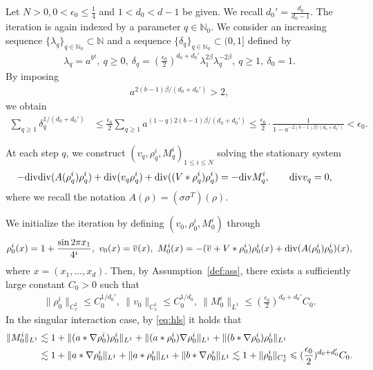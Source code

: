 \documentclass[UTF-8,reqno]{amsart}
\numberwithin{equation}{section}
\theoremstyle{definition}
\def\geq{\geqslant}
\def\leq{\leqslant}
\def\div{\mathord{{\rm div}}}
\def\geq{\geqslant}
\def\leq{\leqslant}
\def\div{\mathord{{\rm div}}}
\begin{document}
Let $N>0,0<\epsilon_0\leq \frac14$ and $1<d_0<d-1$ be given. We recall $d_0'=\frac{d_0}{d_0-1}$. The iteration is again indexed by a parameter
$
q\in\mathbb{N}_0.
$
We consider an increasing sequence
$
\{\lambda_q\}_{q\in\mathbb{N}_0}\subset\mathbb{N}
$
and a sequence
$
\{\delta_q\}_{q\in\mathbb{N}_0}\subset(0,1]
$
defined  by \begin{align*}
\lambda_q
=
a^{b^q},
\ 
q\geq0,
\ 
\delta_q
=
(\frac{\epsilon_0}{2})^{d_0+d_0'}
\lambda_1^{2\beta}
\lambda_q^{-2\beta},
\ 
q\geq1,
\ 
\delta_0=1.
\end{align*}  By imposing
\begin{align}
a^{2(b-1)\beta/(d_0+d_0')}>2,
\label{ieq:5ab2}
\end{align}
we obtain
\begin{align*}
\sum_{q\geq1}\delta_q^{1/(d_0+d_0')}
&\leq
\frac{\epsilon_0}{2} 
\sum_{q\geq1}
a^{(1-q)2(b-1)\beta/(d_0+d_0')}\leq
\frac{\epsilon_0}{2}
\cdot
\frac1{1-a^{-2(b-1)\beta/(d_0+d_0')}}
<
\epsilon_0.
\end{align*}

At each step $q$, we construct  
$
(v_q,\rho^i_q,M^i_q)_{1\leq i\leq N}
$
solving the stationary system
\begin{align}
-\div\div(A(\rho^i_q)\rho^i_q)
+
\div(v_q\rho^i_q)+\div((V*\rho_q^i)\rho_q^i)
&=
-\div M^i_q,
\qquad
\div v_q=0,
\label{eq:5qth}
\end{align}
where we recall the notation
$
A(\rho)=(\sigma\sigma^T)(\rho).
$
 

We initialize the iteration by defining
$
(v_0,\rho^i_0,M^i_0)
$
through
\begin{align*}
\rho^i_0(x)
=
1+\frac{\sin 2\pi x_1}{4^i},
\ 
v_0(x)=\overline v(x),
\ 
M^i_0(x)
=-(\overline v+V*\rho_0^i)\rho^i_0(x)+\div(
A(\rho^i_0)\rho^i_0)(x),
\end{align*}
where
$
x=(x_1,\dots,x_d).
$
Then, by Assumption~\ref{def:ass}, there exists a sufficiently large constant $C_0>0$ such that
\begin{align}
\|\rho^i_0\|_{C_x^2}
\leq
C_0^{1/d_0'},\ \|v_0\|_{C_{x}^1}\leq C_0^{1/d_0},\ 
\|M^i_0\|_{L^1}
\leq
(\frac{\epsilon_0}{2})^{d_0+d_0'}C_0.
\label{bd:5rho_0,M_0}
\end{align}
In the singular interaction  case, by \eqref{eq:hls} it holds that 
 \begin{align}
    \| M^i_0\|_{L^1}&\lesssim 1+\|(a*\nabla \rho_0^i)\rho_0^i\|_{L^1}+\|(a*
\rho^i_0)\nabla \rho^i_0\|_{L^1}+\|(b*\nabla
\rho^i_0)  \rho^i_0\|_{L^1}\notag\\
&\lesssim 1+\|a*\nabla \rho_0^i\|_{L^1}+\|a*
\rho^i_0\|_{L^1}+\|b*\nabla
\rho^i_0\|_{L^1} \lesssim 1+\|\rho^i_0\|_{C_x^1}\leq
(\frac{\epsilon_0}{2})^{d_0+d_0'}C_0.\label{bd:5rho_0,M_02}
 \end{align}
 
\end{document}
